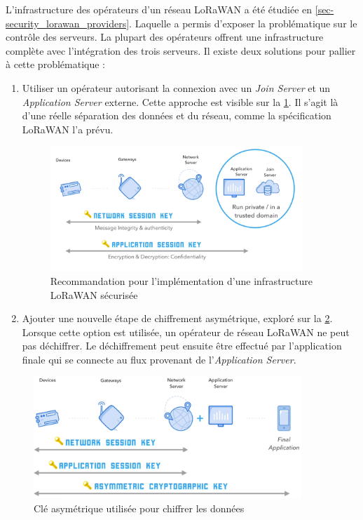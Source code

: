 L'infrastructure des opérateurs d'un réseau LoRaWAN a été étudiée en \cref{sec-security_lorawan_providers}. Laquelle a permis d'exposer la problématique sur le contrôle des serveurs. La plupart des opérateurs offrent une infrastructure complète avec l'intégration des trois serveurs. Il existe deux solutions pour pallier à cette problématique : 
\begin{enumerate}
    \item Utiliser un opérateur autorisant la connexion avec un \textit{Join Server} et un \textit{Application Server} externe. Cette approche est visible sur la \cref{fig-recommendations_a_private_domain}. Il s'agit là d'une réelle séparation des données et du réseau, comme la spécification LoRaWAN l'a prévu.
    
\begin{figure}[ht!]
    \centering
    \includegraphics[width=0.9\textwidth]{Figures/Security/LoRaWAN/recommendations_a_private_domain.PNG}
    \caption{Recommandation pour l'implémentation d'une infrastructure LoRaWAN sécurisée}
    \label{fig-recommendations_a_private_domain}
\end{figure}

    \item Ajouter une nouvelle étape de chiffrement asymétrique, exploré sur la \cref{fig-recommendations_b_asymetric_crypto}. Lorsque cette option est utilisée, un opérateur de réseau LoRaWAN ne peut pas déchiffrer. Le déchiffrement peut ensuite être effectué par l'application finale qui se connecte au flux provenant de l'\textit{Application Server}.
    
\end{enumerate}




\begin{figure}[ht!]
    \centering
    \includegraphics[width=0.9\textwidth]{Figures/Security/LoRaWAN/recommendations_b_asymetric_crypto.png}
    \caption{Clé asymétrique utilisée pour chiffrer les données}
    \label{fig-recommendations_b_asymetric_crypto}
\end{figure}


